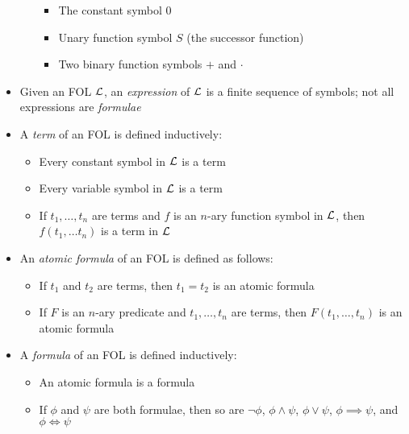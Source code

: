 \begin{itemize}
\begin{itemize}
		\begin{itemize}
			\item The constant symbol $ 0 $
			\item Unary function symbol $ S $ (the successor function)
			\item Two binary function symbols $ + $ and $ \cdot $
		\end{itemize}
	\end{itemize}
	
	\item Given an FOL $ \mathcal{L} $, an \textit{expression} of $ \mathcal{L} $ is a finite sequence of symbols; not all expressions are \textit{formulae}
	
	\item A \textit{term} of an FOL is defined inductively:
	
	\begin{itemize}
		
		\item Every constant symbol in $ \mathcal{L} $ is a term
		
		\item Every variable symbol in $ \mathcal{L} $ is a term
		
		\item If $ t_1, \dots, t_n $ are terms and $ f $ is an $ n $-ary function symbol in $ \mathcal{L} $, then $ f(t_1, \dots t_n) $ is a term in $ \mathcal{L} $
		
	\end{itemize}

	\item An \textit{atomic formula} of an FOL is defined as follows:
	
	\begin{itemize}
		\item If $ t_1 $ and $ t_2 $ are terms, then $ t_1 = t_2 $ is an atomic formula
		
		\item If $ F $ is an $ n $-ary predicate and $ t_1, \dots, t_n $ are terms, then $ F(t_1, \dots, t_n) $ is an atomic formula
	\end{itemize}

	\item A \textit{formula} of an FOL is defined inductively:
	
	\begin{itemize}
		
		\item An atomic formula is a formula
		
		\item If $ \phi $ and $ \psi $ are both formulae, then so are $ \lnot \phi $, $ \phi \land \psi $, $ \phi \lor \psi $, $ \phi \implies \psi $, and $ \phi \iff \psi $
		

\end{itemize}
\end{itemize}
